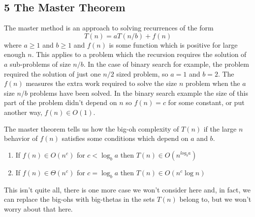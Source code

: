 \documentclass[11pt,a4paper]{scrartcl}
\begin{document}
\subsection*{5 The Master Theorem}

The master method is an approach to solving recurrences of the form
\begin{equation}
T(n)=aT(n/b)+f(n)
\end{equation}
where $a\ge 1$ and $b\ge 1$ and $f(n)$ is some function which is
positive for large enough $n$. This applies to a problem which the
recursion requires the solution of $a$ sub-problems of size $n/b$. In
the case of binary search for example, the problem required the
solution of just one $n/2$ sized problem, so $a=1$ and $b=2$. The
$f(n)$ measures the extra work required to solve the size $n$ problem
when the $a$ size $n/b$ problems have been solved. In the binary
search example the size of this part of the problem didn't depend on
$n$ so $f(n)=c$ for some constant, or put another way, $f(n)\in O(1)$.

The master theorem tells us how the big-oh complexity of $T(n)$ if the large $n$ behavior of $f(n)$ satisfies some conditions which depend on $a$ and $b$. 
\begin{enumerate}
\item If $f(n) \in O(n^c)$ for $c<\log_ba$ then $T(n) \in O(n^{log_ba})$
\item If $f(n) \in \Theta(n^c)$ for $c=\log_ba$ then $T(n) \in O(n^c\log n)$
\end{enumerate}
This isn't quite all, there is one more case we won't consider here
and, in fact, we can replace the big-ohs with big-thetas in the sets
$T(n)$ belong to, but we won't worry about that here.
\end{document}
